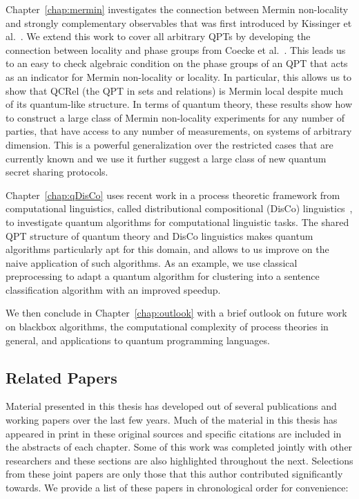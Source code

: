 Chapter~\ref{chap:mermin} investigates the connection between Mermin non-locality and strongly complementary observables that was first introduced by Kissinger et al.~\cite{coecke2012strong}. We extend this work to cover all arbitrary QPTs by developing the connection between locality and phase groups from Coecke et al.~\cite{coecke2011phase}. This leads us to an easy to check algebraic condition on the phase groups of an QPT that acts as an indicator for Mermin non-locality or locality. In particular, this allows us to show that QCRel (the QPT in sets and relations) is Mermin local despite much of its quantum-like structure. In terms of quantum theory, these results show how to construct a large class of Mermin non-locality experiments for any number of parties, that have access to any number of measurements, on systems of arbitrary dimension.  This is a powerful generalization over the restricted cases that are currently known and we use it further suggest a large class of new quantum secret sharing protocols.

Chapter~\ref{chap:qDisCo} uses recent work in a process theoretic framework from computational linguistics, called distributional compositional (DisCo) linguistics~\cite{clark2008compositional}, to investigate quantum algorithms for computational linguistic tasks. The shared QPT structure of quantum theory and DisCo linguistics makes quantum algorithms particularly apt for this domain, and allows to us improve on the naive application of such algorithms. As an example, we use classical preprocessing to adapt a quantum algorithm for clustering into a sentence classification algorithm with an improved speedup.

We then conclude in Chapter~\ref{chap:outlook} with a brief outlook on future work on blackbox algorithms, the computational complexity of process theories in general, and applications to quantum programming languages.
 
\subsection*{Related Papers}

Material presented in this thesis has developed out of several publications and working papers over the last few years. Much of the material in this thesis has appeared in print in these original sources and specific citations are included in the abstracts of each chapter. Some of this work was completed jointly with other researchers and these sections are also highlighted throughout the next.  Selections from these joint papers are only those that this author contributed significantly towards. We provide a list of these papers in chronological order for convenience:

